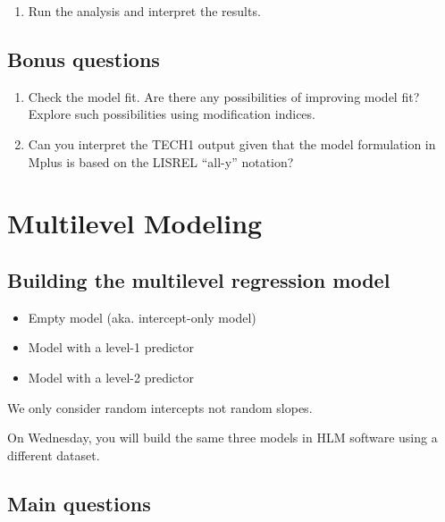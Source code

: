 \documentclass[
]{book}
\providecommand{\tightlist}{%
  \setlength{\itemsep}{0pt}\setlength{\parskip}{0pt}}
\begin{document}
\begin{enumerate}
\def\labelenumi{\arabic{enumi}.}
\setcounter{enumi}{2}
\tightlist
\item
  Run the analysis and interpret the results.
\end{enumerate}

\hypertarget{bonus-questions-2}{%
\section{Bonus questions}\label{bonus-questions-2}}

\begin{enumerate}
\def\labelenumi{\arabic{enumi}.}
\item
  Check the model fit. Are there any possibilities of improving model fit? Explore such possibilities using modification indices.
\item
  Can you interpret the TECH1 output given that the model formulation in Mplus is based on the LISREL ``all-y'' notation?
\end{enumerate}

\hypertarget{multilevel-modeling}{%
\chapter{Multilevel Modeling}\label{multilevel-modeling}}

\hypertarget{building-the-multilevel-regression-model}{%
\section{Building the multilevel regression model}\label{building-the-multilevel-regression-model}}

\begin{itemize}
\tightlist
\item
  Empty model (aka. intercept-only model)
\item
  Model with a level-1 predictor
\item
  Model with a level-2 predictor
\end{itemize}

We only consider random intercepts not random slopes.

On Wednesday, you will build the same three models in HLM software using a different dataset.

\hypertarget{main-questions-3}{%
\section{Main questions}\label{main-questions-3}}
\end{document}
